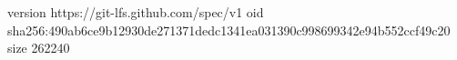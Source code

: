 version https://git-lfs.github.com/spec/v1
oid sha256:490ab6ce9b12930de271371dedc1341ea031390c998699342e94b552ccf49c20
size 262240
